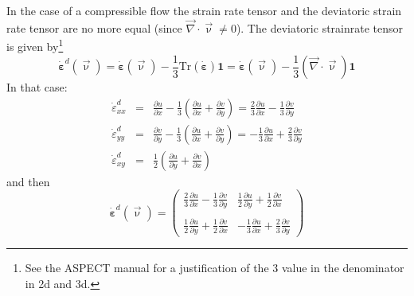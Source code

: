 In the case of a compressible flow the strain rate tensor and the deviatoric strain 
rate tensor are no more equal (since ${\vec\nabla}\cdot\vec{\upnu} \neq 0$).
The deviatoric strainrate tensor is given by\footnote{See the ASPECT manual for a 
justification of the 3 value in the denominator in 2d and 3d.} 
\[
\dot{\bm \varepsilon}^d(\vec{\upnu})=
\dot{\bm \varepsilon}(\vec{\upnu})-\frac{1}{3} \text{Tr}(\dot{\bm \varepsilon}) {\bm 1}
=\dot{\bm \varepsilon}(\vec{\upnu})-\frac{1}{3} ({\vec\nabla}\cdot \vec{\upnu}) {\bm 1}
\]
In that case:
\begin{eqnarray}
\dot{\varepsilon}_{xx}^d 
&=& \frac{\partial u}{\partial x}
-\frac{1}{3} \left( \frac{\partial u}{\partial x} + \frac{\partial v}{\partial y} \right) 
= \frac{2}{3}\frac{\partial u}{\partial x}
-\frac{1}{3} \frac{\partial v}{\partial y}
\\
\dot{\varepsilon}_{yy}^d 
&=& \frac{\partial v}{\partial y}
-\frac{1}{3} \left( \frac{\partial u}{\partial x} + \frac{\partial v}{\partial y} \right) 
=-\frac{1}{3} \frac{\partial u}{\partial x} 
+ \frac{2}{3} \frac{\partial v}{\partial y} 
\\
\dot{\varepsilon}_{xy}^d 
&=& 
\frac12 \left( \frac{\partial u}{\partial y} +\frac{\partial v}{\partial x}  \right)
\end{eqnarray}
and then 
\[
\dot{\bm \varepsilon}^d(\vec{\upnu})
=
\left(
\begin{array}{cc}
\frac{2}{3} \frac{\partial u}{\partial x} -\frac{1}{3} \frac{\partial v}{\partial y} &
\frac{1}{2}\frac{\partial u}{\partial y} + \frac{1}{2}\frac{\partial v}{\partial x}  \\ \\
\frac{1}{2}\frac{\partial u}{\partial y} + \frac{1}{2}\frac{\partial v}{\partial x}  &
-\frac{1}{3} \frac{\partial u}{\partial x} +\frac{2}{3} \frac{\partial v}{\partial y} 
\end{array}
\right)
\]

